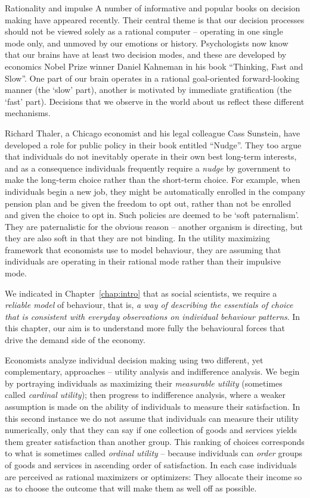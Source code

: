 \begin{ApplicationBox}{Rationality and impulse \label{app:rationalimpulse}}
A number of informative and popular books on decision making have appeared recently. Their central theme is that our decision processes should not be viewed solely as a rational computer -- operating in one single mode only, and unmoved by our emotions or history. Psychologists now know that our brains have at least two decision modes, and these are developed by economics Nobel Prize winner Daniel Kahneman in his book ``Thinking, Fast and Slow''. One part of our brain operates in a rational goal-oriented forward-looking manner (the `slow' part), another is motivated by immediate gratification (the `fast' part). Decisions that we observe in the world about us reflect these different mechanisms. 

\bigskip
Richard Thaler, a Chicago economist and his legal colleague Cass Sunstein, have developed a role for public policy in their book entitled ``Nudge''. They too argue that individuals do not inevitably operate in their own best long-term interests, and as a consequence individuals frequently require a \emph{nudge} by government to make the long-term choice rather than the short-term choice. For example, when individuals begin a new job, they might be automatically enrolled in the company pension plan and be given the freedom to opt out, rather than not be enrolled and given the choice to opt in. Such policies are deemed to be `soft paternalism'. They are paternalistic for the obvious reason -- another organism is directing, but they are also soft in that they are not binding. In the utility maximizing framework that economists use to model behaviour, they are assuming that individuals are operating in their rational mode rather than their impulsive mode.   
\end{ApplicationBox}

We indicated in Chapter~\ref{chap:intro} that as social scientists, we require a \textit{reliable model} of behaviour, that is, \textit{a way of describing the essentials of choice that is consistent with everyday observations on individual behaviour patterns}. In this chapter, our aim is to understand more fully the behavioural forces that drive the demand side of the economy.

Economists analyze individual decision making using two different, yet complementary, approaches -- utility analysis and indifference analysis. We begin by portraying individuals as maximizing their \textit{measurable utility} (sometimes called \textit{cardinal utility}); then progress to indifference analysis, where a weaker assumption is made on the ability of individuals to measure their satisfaction. In this second instance we do not assume that individuals can measure their utility numerically, only that they can say if one collection of goods and services yields them greater satisfaction than another group. This ranking of choices corresponds to what is sometimes called \textit{ordinal utility} -- because individuals can \textit{order} groups of goods and services in ascending order of satisfaction. In each case individuals are perceived as rational maximizers or optimizers: They allocate their income so as to choose the outcome that will make them as well off as possible.